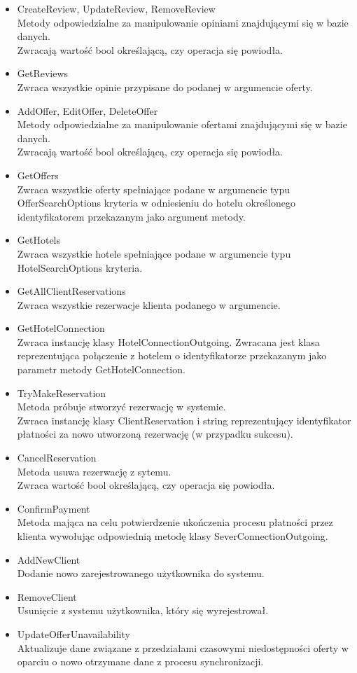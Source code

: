 \documentclass{article}
\begin{document}
\begin{itemize}
    \item CreateReview, UpdateReview, RemoveReview\\
    Metody odpowiedzialne za manipulowanie opiniami znajdującymi się w bazie danych.\\
    Zwracają wartość bool określającą, czy operacja się powiodła.
    \item GetReviews\\
    Zwraca wszystkie opinie przypisane do podanej w argumencie oferty.
    \item AddOffer, EditOffer, DeleteOffer\\
    Metody odpowiedzialne za manipulowanie ofertami znajdującymi się w bazie danych.\\
    Zwracają wartość bool określającą, czy operacja się powiodła.
    \item GetOffers\\
    Zwraca wszystkie oferty spełniające podane w argumencie typu OfferSearchOptions kryteria w odniesieniu do hotelu określonego identyfikatorem przekazanym jako argument metody.
    \item GetHotels\\
    Zwraca wszystkie hotele spełniające podane w argumencie typu HotelSearchOptions kryteria.
    \item GetAllClientReservations\\
    Zwraca wszystkie rezerwacje klienta podanego w argumencie.
    \item GetHotelConnection\\
    Zwraca instancję klasy HotelConnectionOutgoing. Zwracana jest klasa reprezentująca połączenie z hotelem o identyfikatorze przekazanym jako parametr metody GetHotelConnection.
    \item TryMakeReservation\\
    Metoda próbuje stworzyć rezerwację w systemie.\\
    Zwraca instancję klasy ClientReservation i string reprezentujący identyfikator płatności za nowo utworzoną rezerwację (w przypadku sukcesu).
    \item CancelReservation\\
    Metoda usuwa rezerwację z sytemu.\\
    Zwraca wartość bool określającą, czy operacja się powiodła.
    \item ConfirmPayment\\
    Metoda mająca na celu potwierdzenie ukończenia procesu płatności przez klienta wywołując odpowiednią metodę klasy SeverConnectionOutgoing.
    \item AddNewClient\\
    Dodanie nowo zarejestrowanego użytkownika do systemu.
    \item RemoveClient\\
    Usunięcie z systemu użytkownika, który się wyrejestrował.
    \item UpdateOfferUnavailability\\
    Aktualizuje dane związane z przedziałami czasowymi niedostępności oferty w oparciu o nowo otrzymane dane z procesu synchronizacji.
\end{itemize}
\end{document}

